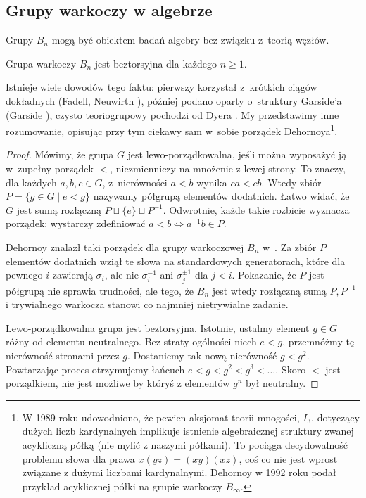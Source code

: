
\subsection{Grupy warkoczy w algebrze}
Grupy $B_n$ mogą być obiektem badań algebry bez związku z~teorią węzłów.

\begin{proposition}
    Grupa warkoczy $B_n$ jest beztorsyjna dla każdego $n \ge 1$.
\end{proposition}

Istnieje wiele dowodów tego faktu: pierwszy korzystał z~krótkich ciągów dokładnych (Fadell, Neuwirth \cite{neuwirth1962}), później podano oparty o~struktury Garside'a (Garside \cite{garside1969}), czysto teoriogrupowy pochodzi od Dyera \cite{dyer1980}.
%
%
%
%
My przedstawimy inne rozumowanie, opisując przy tym ciekawy sam w~sobie porządek Dehornoya\footnote{W 1989 roku udowodniono, że pewien aksjomat teorii mnogości, $I_3$, dotyczący dużych liczb kardynalnych implikuje istnienie algebraicznej struktury zwanej acykliczną półką (nie mylić z naszymi półkami).
To pociąga decydowalność problemu słowa dla prawa $x(yz) = (xy)(xz)$, coś co nie jest wprost związane z dużymi liczbami kardynalnymi.
Dehornoy w 1992 roku podał przykład acyklicznej półki na grupie warkoczy $B_\infty$.}.%
%

\begin{proof}
%
    Mówimy, że grupa $G$ jest lewo-porządkowalna, jeśli można wyposażyć ją w~zupełny porządek $<$, niezmienniczy na mnożenie z lewej strony.
    To znaczy, dla każdych $a, b, c \in G$, z~nierówności $a < b$ wynika $ca < cb$.
    Wtedy zbiór $P = \{g \in G \mid e < g\}$ nazywamy półgrupą elementów dodatnich.
    Łatwo widać, że $G$ jest sumą rozłączną $P \sqcup \{e\} \sqcup P^{-1}$.
    Odwrotnie, każde takie rozbicie wyznacza porządek: wystarczy zdefiniować $a < b \iff a^{-1}b \in P$.

    Dehornoy znalazł taki porządek dla grupy warkoczowej $B_n$ w~\cite{dehornoy1994}.
    Za zbiór $P$ elementów dodatnich wziął te słowa na standardowych generatorach, które dla pewnego $i$ zawierają $\sigma_i$, ale nie $\sigma_i^{-1}$ ani $\sigma_j^{\pm 1}$ dla $j < i$.
    Pokazanie, że $P$ jest półgrupą nie sprawia trudności, ale tego, że $B_n$ jest wtedy rozłączną sumą $P, P^{-1}$ i trywialnego warkocza stanowi co najmniej nietrywialne zadanie.

    Lewo-porządkowalna grupa jest beztorsyjna.
    Istotnie, ustalmy element $g \in G$ różny od elementu neutralnego.
    Bez straty ogólności niech $e < g$, przemnóżmy tę nierówność stronami przez $g$.
    Dostaniemy tak nową nierówność $g < g^2$.
    Powtarzając proces otrzymujemy łańcuch $e < g < g^2 < g^3 < \ldots$.
    Skoro $<$ jest porządkiem, nie jest możliwe by któryś z elementów $g^n$ był neutralny.
\end{proof}

